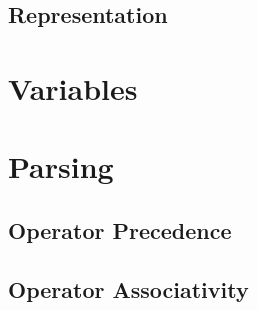 \subsection{Representation}


\csharpsubsection{\csharp}

\section{Variables}
\csharpsubsection{\csharp}

\section{Parsing}
\subsection{Operator Precedence}
\subsection{Operator Associativity}

